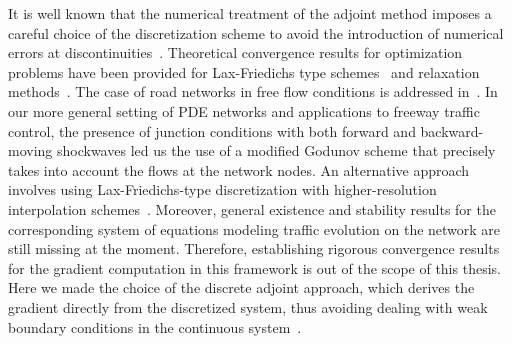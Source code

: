 It is well known that the numerical treatment of the adjoint method imposes a careful choice of the discretization scheme to avoid the introduction of numerical errors  at discontinuities~\cite{Apice2010Modeling}.
Theoretical convergence results for optimization problems have been provided for Lax-Friedichs type schemes~\cite{Giles2010Convergencea} and relaxation methods~\cite{Banda2012Adjoint}.
The case of road networks in free flow conditions is addressed in~\cite{Gugat2005}.
In our more general setting of PDE networks and applications to freeway traffic control, the presence of junction conditions with both forward and backward-moving shockwaves led us the use of a modified Godunov scheme that precisely takes into account the flows at the network nodes. An alternative approach involves using Lax-Friedichs-type discretization with higher-resolution interpolation schemes~\cite{Nessyahu1990NonOscillatory}. Moreover, general existence and stability results for the corresponding system of equations modeling traffic evolution on the network are still missing at the moment.
Therefore, establishing rigorous convergence results for the gradient computation in this framework is out of the scope of this thesis. Here we made the choice of the discrete adjoint approach, which derives the gradient directly from the discretized system, thus avoiding dealing with weak boundary conditions in the continuous system~\cite{garavello2006traffic,work2010traffic,strub2006weak}.







